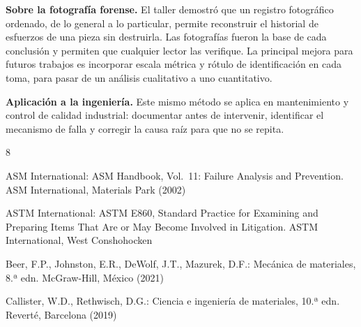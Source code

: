 \documentclass[runningheads]{llncs}
\begin{document}
\textbf{Sobre la fotografía forense.} El taller demostró que un registro fotográfico ordenado, de lo general a lo particular, permite reconstruir el historial de esfuerzos de una pieza sin destruirla. Las fotografías fueron la base de cada conclusión y permiten que cualquier lector las verifique. La principal mejora para futuros trabajos es incorporar escala métrica y rótulo de identificación en cada toma, para pasar de un análisis cualitativo a uno cuantitativo.

\textbf{Aplicación a la ingeniería.} Este mismo método se aplica en mantenimiento y control de calidad industrial: documentar antes de intervenir, identificar el mecanismo de falla y corregir la causa raíz para que no se repita.

\begin{thebibliography}{8}

ASM International: ASM Handbook, Vol.~11: Failure Analysis and Prevention. ASM International, Materials Park (2002)

ASTM International: ASTM E860, Standard Practice for Examining and Preparing Items That Are or May Become Involved in Litigation. ASTM International, West Conshohocken

Beer, F.P., Johnston, E.R., DeWolf, J.T., Mazurek, D.F.: Mecánica de materiales, 8.ª edn. McGraw-Hill, México (2021)

Callister, W.D., Rethwisch, D.G.: Ciencia e ingeniería de materiales, 10.ª edn. Reverté, Barcelona (2019)

\end{thebibliography}
\end{document}
